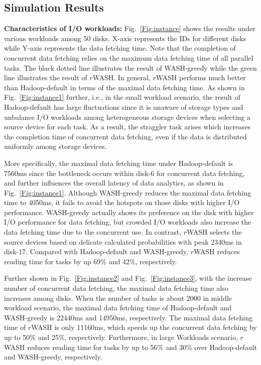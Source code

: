\documentclass[conference]{IEEEtran}
\begin{document}
\subsection{Simulation Results}

\textbf{Characteristics of I/O workloads:} Fig.~\ref{Fig:instance} shows the results under various workloads among 50 disks. X-axis represents the IDs for different disks while Y-axis represents the data fetching time. Note that the completion of concurrent data fetching relies on the maximum data fetching time of all parallel tasks. The black dotted line illustrates the result of WASH-greedy while the green line illustrates the result of $r$WASH. In general, $r$WASH performs much better than Hadoop-default in terms of the maximal data fetching time. As shown in Fig.~\ref{Fig:instance1} further, i.e., in the small workload scenario, the result of Hadoop-default has large fluctuations since it is unaware of storage types and unbalance I/O workloads among heterogeneous storage devices when selecting a source device for each task. As a result, the straggler task arises which increases the completion time of concurrent data fetching, even if the data is distributed uniformly among storage devices.

More specifically, the maximal data fetching time under Hadoop-default is 7560ms since the bottleneck occurs within disk-6 for concurrent data fetching, and further influences the overall latency of data analytics, as shown in Fig.~\ref{Fig:instance1}. Although WASH-greedy reduces the maximal data fetching time to 4050ms, it fails to avoid the hotspots on those disks with higher I/O performance. WASH-greedy actually shows its preference on the disk with higher I/O performance for data fetching, but crowded I/O workloads also increase the data fetching time due to the concurrent use. In contrast, $r$WASH selects the source devices based on delicate calculated probabilities with peak 2340ms in disk-17. 
Compared with Hadoop-default and WASH-greedy, $r$WASH reduces reading time for tasks by up 69\% and 42\%, respectively.   

Further shown in Fig.~\ref{Fig:instance2} and Fig.~\ref{Fig:instance3}, with the increase number of concurrent data fetching, the maximal data fetching time also increases among disks. When the number of tasks is about 2000 in middle workload scenario, the maximal data fetching time of 
Hadoop-default and WASH-greedy is 22440ms and 14950ms, respectively. The maximal data fetching time of $r$WASH is only 11160ms, which speeds up the concurrent data fetching by up to 50\% and 25\%, respectively. 
Furthermore, in large Workloads scenario, $r$WASH reduces reading time for tasks by up to 56\% and 30\% over Hadoop-default and WASH-greedy, respectively. 
\end{document}
